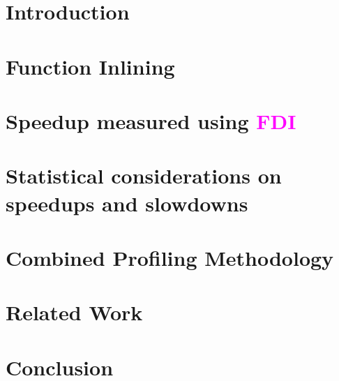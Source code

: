 \documentclass[conference]{IEEEtran}
\renewcommand{\ifColorText}[2]{\textcolor{#1}{#2}}  %
\def\FDI{{\ifColorText{Magenta}{FDI}}}
\begin{document}
\section{Introduction}
	\label{sec:intro}
	

\section{Function Inlining}
	\label{sec:inlining}
	

\section{Speedup measured using \FDI\ }
	\label{sec:speedup}
	

\section{Statistical considerations on speedups and slowdowns}
	\label{sec:robust}
	

\section{Combined Profiling Methodology}
	\label{sec:cmbprof}
	

\section{Related Work}
	\label{sec:related}
	

\section{Conclusion}
	\label{sec:conclusion}
	

%	

%


\end{document}
